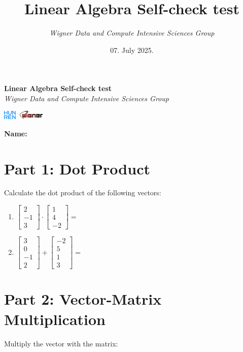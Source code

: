\documentclass{article}
\title{Linear Algebra Self-check test}
\date{07. July 2025.}
\author{\textit{Wigner Data and Compute Intensive Sciences Group}}
\begin{document}
\begin{minipage}{0.8\textwidth}
	\centering
	{\Large\textbf{Linear Algebra Self-check test}\\ \textit{Wigner Data and Compute Intensive Sciences Group}}
\end{minipage}
\begin{minipage}{0.2\textwidth}
	\includegraphics[width=2cm]{img/logo.png}
\end{minipage}


\vspace{0.75cm}

\textbf{Name:} \underline{\hspace{5cm}}

\section*{Part 1: Dot Product}
Calculate the dot product of the following vectors:

\begin{enumerate}
\item $\begin{bmatrix} 2 \\ -1 \\ 3 \end{bmatrix} \cdot \begin{bmatrix} 1 \\ 4 \\ -2 \end{bmatrix} = $ \underline{\hspace{3cm}}

\item $\begin{bmatrix} 3 \\ 0 \\ -1 \\ 2 \end{bmatrix} + \begin{bmatrix} -2 \\ 5 \\ 1 \\ 3 \end{bmatrix} = $ \underline{\hspace{3cm}}
\end{enumerate}

\section*{Part 2: Vector-Matrix Multiplication}
Multiply the vector with the matrix:
\end{document}
